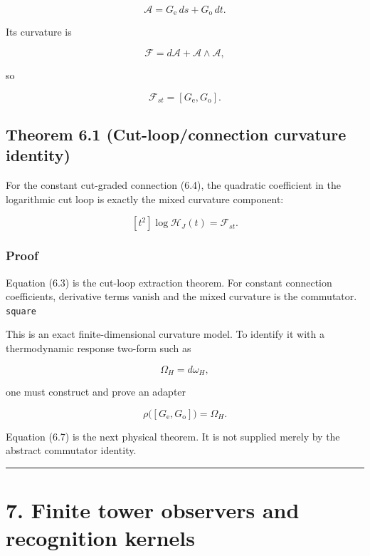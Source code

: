\[
\mathcal A
=G_{\mathrm e}\,ds+G_{\mathrm o}\,dt.
\tag{6.4}
\]

Its curvature is

\[
\mathcal F
=d\mathcal A+\mathcal A\wedge\mathcal A,
\]

so

\[
\boxed{
\mathcal F_{st}
=[G_{\mathrm e},G_{\mathrm o}].
}
\tag{6.5}
\]

\hypertarget{theorem-6.1-cut-loopconnection-curvature-identity}{%
\subsection{Theorem 6.1 (Cut-loop/connection curvature identity)}\label{theorem-6.1-cut-loopconnection-curvature-identity}}

For the constant cut-graded connection (6.4), the quadratic coefficient in the
logarithmic cut loop is exactly the mixed curvature component:

\[
\boxed{
[t^2]\log\mathscr H_J(t)
=
\mathcal F_{st}.
}
\tag{6.6}
\]

\hypertarget{proof-3}{%
\subsubsection{Proof}\label{proof-3}}

Equation (6.3) is the cut-loop extraction theorem. For constant connection
coefficients, derivative terms vanish and the mixed curvature is the
commutator. \texttt{square}

This is an exact finite-dimensional curvature model. To identify it with a
thermodynamic response two-form such as

\[
\Omega_H=d\omega_H,
\]

one must construct and prove an adapter

\[
\boxed{
\rho\bigl([G_{\mathrm e},G_{\mathrm o}]\bigr)
=\Omega_H.
}
\tag{6.7}
\]

Equation (6.7) is the next physical theorem. It is not supplied merely by the
abstract commutator identity.

\begin{center}\rule{0.5\linewidth}{0.5pt}\end{center}

\hypertarget{finite-tower-observers-and-recognition-kernels}{%
\section{7. Finite tower observers and recognition kernels}\label{finite-tower-observers-and-recognition-kernels}}

